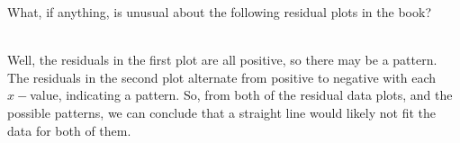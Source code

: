 What, if anything, is unusual about the following residual plots in the book?\\

\begin{solution}\renewcommand{\qedsymbol}{}\ \\
    Well, the residuals in the first plot are all positive, so there may be a pattern. The residuals in
    the second plot alternate from positive to negative with each $x-$value, indicating a pattern. So,
    from both of the residual data plots, and the possible patterns, we can conclude that a straight
    line would likely not fit the data for both of them.

\end{solution}